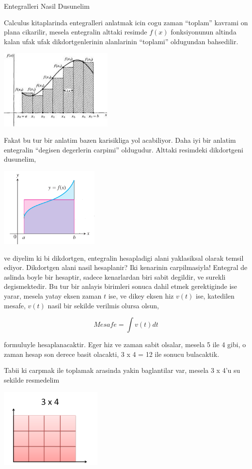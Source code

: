 \documentclass[12pt,fleqn]{article}
\begin{document}
Entegralleri Nasil Dusunelim

Calculus kitaplarinda entegralleri anlatmak icin cogu zaman ``toplam''
kavrami on plana cikarilir, mesela entegralin alttaki resimde $f(x)$
fonksiyonunun altinda kalan ufak ufak dikdortgenlerinin alanlarinin
``toplami'' oldugundan bahsedilir.

\includegraphics[height=4cm]{area.png}

Fakat bu tur bir anlatim bazen karisikliga yol acabiliyor. Daha iyi bir
anlatim entegralin ``degisen degerlerin carpimi'' oldugudur. Alttaki
resimdeki dikdortgeni dusunelim, 

\includegraphics[height=4cm]{box.png}

ve diyelim ki bi dikdortgen, entegralin hesapladigi alani yaklasiksal
olarak temsil ediyor. Dikdortgen alani nasil hesaplanir? Iki kenarinin
carpilmasiyla! Entegral de aslinda boyle bir hesaptir, sadece kenarlardan
biri sabit degildir, ve surekli degismektedir. Bu tur bir anlayis birimleri
sonuca dahil etmek gerektiginde ise yarar, mesela yatay eksen zaman $t$
ise, ve dikey eksen hiz $v(t)$ ise, katedilen mesafe, $v(t)$ nasil bir
sekilde verilmis olursa olsun,

\[ Mesafe = \int v(t)dt \]

formuluyle hesaplanacaktir. Eger hiz ve zaman sabit olsalar, mesela 5 ile 4
gibi, o zaman hesap son derece basit olacakti, 3 x 4 = 12 ile sonucu
bulacaktik. 

Tabii ki carpmak ile toplamak arasinda yakin baglantilar var, mesela 3 x
4'u su sekilde resmedelim

\includegraphics[height=4cm]{grid-multiplication.png}
\end{document}

